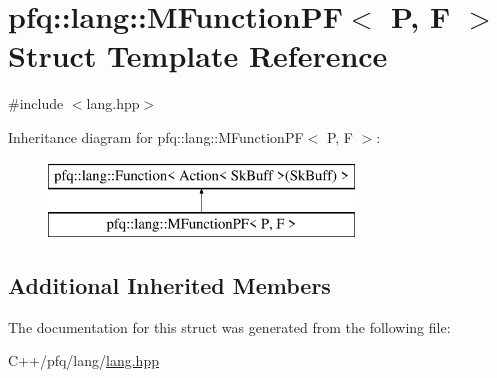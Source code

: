 \hypertarget{structpfq_1_1lang_1_1MFunctionPF}{\section{pfq\+:\+:lang\+:\+:M\+Function\+P\+F$<$ P, F $>$ Struct Template Reference}
\label{structpfq_1_1lang_1_1MFunctionPF}
}


{\ttfamily \#include $<$lang.\+hpp$>$}

Inheritance diagram for pfq\+:\+:lang\+:\+:M\+Function\+P\+F$<$ P, F $>$\+:\begin{figure}[H]
\begin{center}
\leavevmode
\includegraphics[height=2.000000cm]{structpfq_1_1lang_1_1MFunctionPF}
\end{center}
\end{figure}
\subsection*{Additional Inherited Members}


The documentation for this struct was generated from the following file\+:\begin{DoxyCompactItemize}
\item 
C++/pfq/lang/\hyperlink{lang_8hpp}{lang.\+hpp}\end{DoxyCompactItemize}
